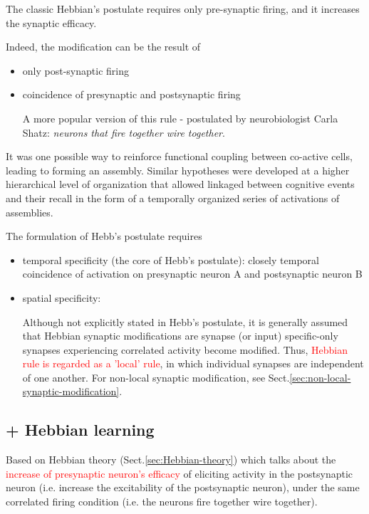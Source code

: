 The classic Hebbian's postulate requires only pre-synaptic firing, and it
increases the synaptic efficacy.

Indeed, the modification can be the result of 
\begin{itemize}
  \item only post-synaptic firing
  \item coincidence of presynaptic and postsynaptic firing

A more popular version of this rule - postulated by neurobiologist Carla
Shatz: {\it neurons that fire together wire together}.
\end{itemize}

It was one possible way to reinforce functional coupling between co-active
cells, leading to forming an assembly. Similar hypotheses were developed at a
higher hierarchical level of organization that allowed linkaged between
cognitive events and their recall in the form of a temporally organized series
of activations of assemblies.

The formulation of Hebb's postulate requires
\begin{itemize}
  \item temporal specificity (the core of Hebb's postulate): closely temporal
  coincidence of activation on presynaptic neuron A and postsynaptic neuron B
  
 
  \item spatial specificity:  
  
  Although not explicitly stated in Hebb's postulate,  it is generally assumed that
Hebbian synaptic modifications are synapse (or input) specific-only synapses
experiencing correlated activity become modified. Thus, \textcolor{red}{Hebbian
rule is regarded as a 'local' rule}, in which individual synapses are
independent of one another. For non-local synaptic modification, see
Sect.\ref{sec:non-local-synaptic-modification}.
\end{itemize}

\subsection{+ Hebbian learning}
\label{sec:Hebbian-learning}

Based on Hebbian theory (Sect.\ref{sec:Hebbian-theory}) which talks about the
\textcolor{red}{increase of presynaptic neuron's efficacy} of eliciting activity
in the postsynaptic neuron (i.e. increase the excitability of the postsynaptic
neuron), under the same correlated firing condition (i.e. the
neurons fire together wire together). 

